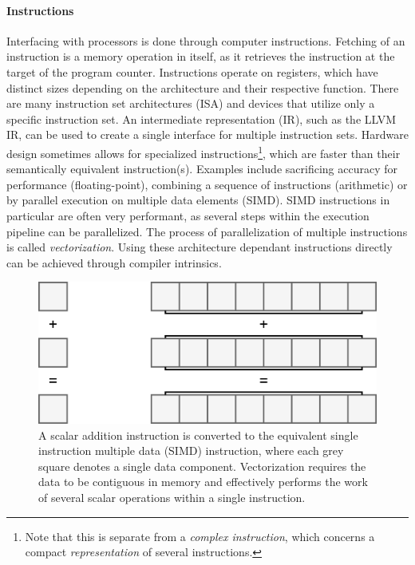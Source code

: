 \documentclass{article}
\begin{document}
\paragraph{Instructions}

Interfacing with processors is done through computer instructions.
Fetching of an instruction is a memory operation in itself, as it retrieves the instruction at the target of the program counter.
Instructions operate on registers, which have distinct sizes depending on the architecture and their respective function.
There are many instruction set architectures (ISA) and devices that utilize only a specific instruction set.
An intermediate representation (IR), such as the LLVM IR\cite{LLVM}, can be used to create a single interface for multiple instruction sets\cite{intermediate-representation}.
Hardware design sometimes allows for specialized instructions\footnote{Note that this is separate from a {\it complex instruction}, which concerns a compact {\it representation} of several instructions. }, which are faster than their semantically equivalent instruction(s).
Examples include sacrificing accuracy for performance (floating-point), combining a sequence of instructions (arithmetic) or by parallel execution on multiple data elements (SIMD).
SIMD instructions in particular are often very performant, as several steps within the execution pipeline can be parallelized.
The process of parallelization of multiple instructions is called {\it vectorization}.
Using these architecture dependant instructions directly can be achieved through compiler intrinsics.

\begin{figure}[ht]
    \centering
    \includegraphics[scale=0.1]{Performance2.png}
    \caption
    {
        A scalar addition instruction is converted to the equivalent single instruction multiple data (SIMD) instruction, where each grey square denotes a single data component.
        Vectorization requires the data to be contiguous in memory and effectively performs the work of several scalar operations within a single instruction.  
    }
\end{figure}
\end{document}

